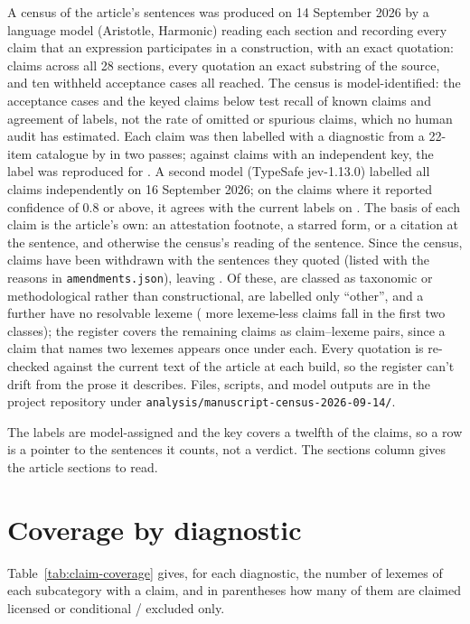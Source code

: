 \documentclass[12pt]{article}
\begin{document}
A census of the article's sentences was produced on 14 September 2026 by a language model (Aristotle, Harmonic) reading each section and recording every claim that an expression participates in a construction, with an exact quotation: \censusClaims{} claims across all 28 sections, every quotation an exact substring of the source, and ten withheld acceptance cases all reached. The census is model-identified: the acceptance cases and the keyed claims below test recall of known claims and agreement of labels, not the rate of omitted or spurious claims, which no human audit has estimated. Each claim was then labelled with a diagnostic from a 22-item catalogue by  in two passes; against \keyedClaims{} claims with an independent key, the label was reproduced for \keyedAgree{}. A second model (TypeSafe jev-1.13.0) labelled all \censusClaims{} claims independently on 16 September 2026; on the \typesafeAccepted{} claims where it reported confidence of 0.8 or above, it agrees with the current labels on \typesafeAgree{}. The basis of each claim is the article's own: an attestation footnote, a starred form, or a citation at the sentence, and otherwise the census's reading of the sentence. Since the census, \withdrawnClaims{} claims have been withdrawn with the sentences they quoted (listed with the reasons in \texttt{amendments.json}), leaving \liveClaims{}. Of these, \taxonomicClaims{} are classed as taxonomic or methodological rather than constructional, \otherClaims{} are labelled only \enquote{other}, and a further \lexemelessOnly{} have no resolvable lexeme (\lexemelessOverlap{} more lexeme-less claims fall in the first two classes); the register covers the remaining \retainedClaims{} claims as \claimPairs{} claim--lexeme pairs, since a claim that names two lexemes appears once under each. Every quotation is re-checked against the current text of the article at each build, so the register can't drift from the prose it describes. Files, scripts, and model outputs are in the project repository under \texttt{analysis/manuscript-census-2026-09-14/}.

The labels are model-assigned and the key covers a twelfth of the claims, so a row is a pointer to the sentences it counts, not a verdict. The sections column gives the article sections to read.

\section{Coverage by diagnostic}

Table~\ref{tab:claim-coverage} gives, for each diagnostic, the number of lexemes of each subcategory with a claim, and in parentheses how many of them are claimed licensed or conditional / excluded only.
\end{document}

